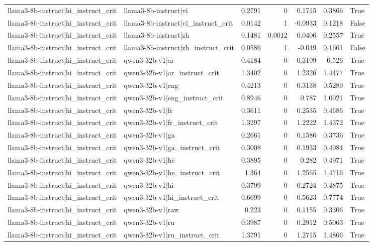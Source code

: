 \begin{table}
\begin{tabular}{l l r r r r l}
llama3-8b-instruct|hi_instruct_crit & llama3-8b-instruct|vi & 0.2791 & 0 & 0.1715 & 0.3866 & True \\
llama3-8b-instruct|hi_instruct_crit & llama3-8b-instruct|vi_instruct_crit & 0.0142 & 1 & -0.0933 & 0.1218 & False \\
llama3-8b-instruct|hi_instruct_crit & llama3-8b-instruct|zh & 0.1481 & 0.0012 & 0.0406 & 0.2557 & True \\
llama3-8b-instruct|hi_instruct_crit & llama3-8b-instruct|zh_instruct_crit & 0.0586 & 1 & -0.049 & 0.1661 & False \\
llama3-8b-instruct|hi_instruct_crit & qwen3-32b-v1|ar & 0.4184 & 0 & 0.3109 & 0.526 & True \\
llama3-8b-instruct|hi_instruct_crit & qwen3-32b-v1|ar_instruct_crit & 1.3402 & 0 & 1.2326 & 1.4477 & True \\
llama3-8b-instruct|hi_instruct_crit & qwen3-32b-v1|eng & 0.4213 & 0 & 0.3138 & 0.5289 & True \\
llama3-8b-instruct|hi_instruct_crit & qwen3-32b-v1|eng_instruct_crit & 0.8946 & 0 & 0.787 & 1.0021 & True \\
llama3-8b-instruct|hi_instruct_crit & qwen3-32b-v1|fr & 0.3611 & 0 & 0.2535 & 0.4686 & True \\
llama3-8b-instruct|hi_instruct_crit & qwen3-32b-v1|fr_instruct_crit & 1.3297 & 0 & 1.2222 & 1.4372 & True \\
llama3-8b-instruct|hi_instruct_crit & qwen3-32b-v1|ga & 0.2661 & 0 & 0.1586 & 0.3736 & True \\
llama3-8b-instruct|hi_instruct_crit & qwen3-32b-v1|ga_instruct_crit & 0.3008 & 0 & 0.1933 & 0.4084 & True \\
llama3-8b-instruct|hi_instruct_crit & qwen3-32b-v1|he & 0.3895 & 0 & 0.282 & 0.4971 & True \\
llama3-8b-instruct|hi_instruct_crit & qwen3-32b-v1|he_instruct_crit & 1.364 & 0 & 1.2565 & 1.4716 & True \\
llama3-8b-instruct|hi_instruct_crit & qwen3-32b-v1|hi & 0.3799 & 0 & 0.2724 & 0.4875 & True \\
llama3-8b-instruct|hi_instruct_crit & qwen3-32b-v1|hi_instruct_crit & 0.6699 & 0 & 0.5623 & 0.7774 & True \\
llama3-8b-instruct|hi_instruct_crit & qwen3-32b-v1|raw & 0.223 & 0 & 0.1155 & 0.3306 & True \\
llama3-8b-instruct|hi_instruct_crit & qwen3-32b-v1|ru & 0.3987 & 0 & 0.2912 & 0.5063 & True \\
llama3-8b-instruct|hi_instruct_crit & qwen3-32b-v1|ru_instruct_crit & 1.3791 & 0 & 1.2715 & 1.4866 & True \\

\end{tabular}
\end{table}
